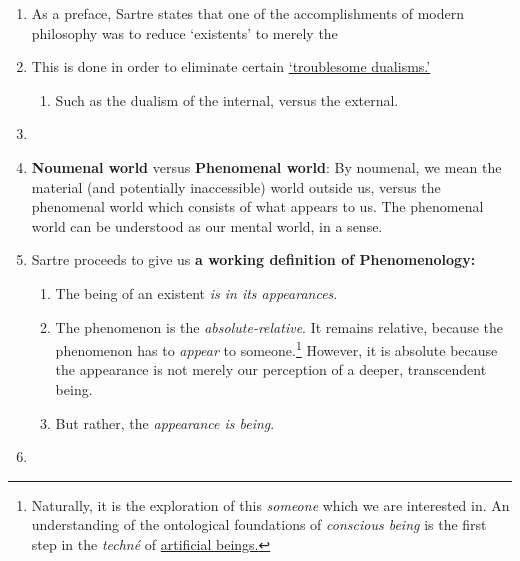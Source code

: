 \begin{enumerate}
  \item As a preface, Sartre states that one of the accomplishments of modern philosophy was to reduce \enquote*{existents} to merely the 
  \item This is done in order to eliminate certain \href{https://plato.stanford.edu/entries/dualism/#ProForDua}{\enquote*{troublesome dualisms.}}
  \begin{enumerate}
    \item Such as the dualism of the internal, versus the external.
  \end{enumerate}
  \item {}
  \item \textbf{Noumenal world} versus \textbf{Phenomenal world}:
  By noumenal, we mean the material (and potentially inaccessible) world outside us, versus the phenomenal world which consists of what appears to us. The phenomenal world can be understood as our mental world, in a sense.
  \item Sartre proceeds to give us \textbf{a working definition of Phenomenology:}
  \begin{enumerate}
    \item The being of an existent \emph{is in its appearances}. 
    \item The phenomenon is the \emph{absolute-relative}. It remains relative, because the phenomenon has to \emph{appear} to someone.\footnote{Naturally, it is the exploration of this \emph{someone} which we are interested in. An understanding of the ontological foundations of \emph{conscious being} is the first step in the \emph{techné} of \href{https://plato.stanford.edu/entries/artificial-intelligence/}{artificial beings.}} However, it is absolute because the appearance is not merely our perception of a deeper, transcendent being.
    \item But rather, the \emph{appearance is being}.
  \end{enumerate}
  \item {}

\end{enumerate}
